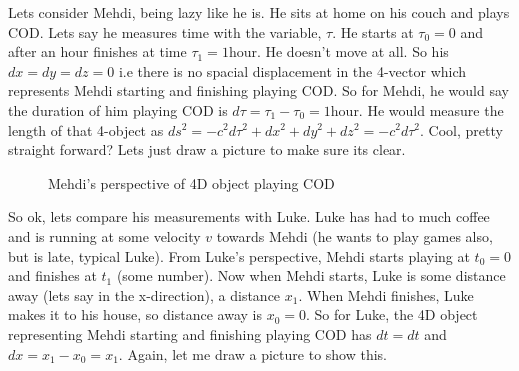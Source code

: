Lets consider Mehdi, being lazy like he is. He sits at home on his couch and plays COD. Lets say he measures time with the variable, $\tau$. He starts at $\tau_0 = 0$ and after an hour finishes at time $\tau_1 = 1$hour. He doesn't move at all. So his $dx = dy = dz =0$ i.e there is no spacial displacement in the 4-vector which represents Mehdi starting and finishing playing COD. So for Mehdi, he would say the duration of him playing COD is $d\tau = \tau_1 - \tau_0 = 1$hour. He would measure the length of that 4-object as $ds^2 = - c^2 d\tau^2 + dx^2 + dy^2 + dz^2 = -c^2 d\tau^2$. Cool, pretty straight forward? Lets just draw a picture to make sure its clear. 

\begin{figure}[h]
  \centering
{}
\caption{Mehdi's perspective of 4D object playing COD}
\label{fig:M4d}
\end{figure}

So ok, lets compare his measurements with Luke. Luke has had to much coffee and is running at some velocity $v$ towards Mehdi (he wants to play games also, but is late, typical Luke). From Luke's perspective, Mehdi starts playing at $t_0 = 0$ and finishes at $t_1$ (some number). Now when Mehdi starts, Luke is some distance away (lets say in the x-direction), a distance $x_1$. When Mehdi finishes, Luke makes it to his house, so distance away is $x_0 =0$. So for Luke, the 4D object representing Mehdi starting and finishing playing COD has $dt = dt$ and $dx = x_1 - x_0 = x_1$. Again, let me draw a picture to show this. 

